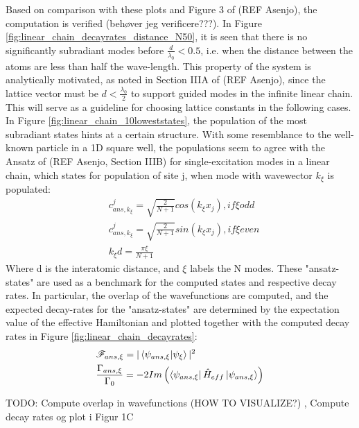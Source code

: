 \documentclass{article}
\begin{document}
Based on comparison with these plots and Figure 3 of (REF Asenjo), the computation is verified (behøver jeg verificere???). In Figure \ref{fig:linear_chain_decayrates_distance_N50}, it is seen that there is no significantly subradiant modes before $\frac{d}{\lambda_0} < 0.5$, i.e. when the distance between the atoms are less than half the wave-length. This property of the system is analytically motivated, as noted in Section IIIA of (REF Asenjo), since the lattice vector must be $d < \frac{\lambda_0}{2}$ to support guided modes in the infinite linear chain. This will serve as a guideline for choosing lattice constants in the following cases. In Figure \ref{fig:linear_chain_10loweststates}, the population of the most subradiant states hints at a certain structure. With some resemblance to the well-known particle in a 1D square well, the populations seem to agree with the Ansatz of (REF Asenjo, Section IIIB) for single-excitation modes in a linear chain, which states for population of site j, when mode with wavewector $k_\xi$ is populated: 
\begin{equation}\label{eq:ansatz}
    \begin{split}
        & c^j_{ans,k_\xi} = \sqrt{\frac{2}{N + 1}} cos(k_\xi x_j), if \xi odd \\
        & c^j_{ans,k_\xi} = \sqrt{\frac{2}{N + 1}} sin(k_\xi x_j), if \xi even \\
        & k_\xi d = \frac{\pi \xi}{N + 1}
    \end{split}
\end{equation}
Where d is the interatomic distance, and $\xi$ labels the N modes. These "ansatz-states" are used as a benchmark for the computed states and respective decay rates. In particular, the overlap of the wavefunctions are computed, and the expected decay-rates for the "ansatz-states" are determined by the expectation value of the effective Hamiltonian and plotted together with the computed decay rates in Figure \ref{fig:linear_chain_decayrates}:
\begin{equation}\label{eq:overlap}
    \begin{split}
        &\mathscr{F}_{ans,\xi} = |\bra{\psi_{ans,\xi}}\ket{\psi_\xi}|^2 \\
        &\frac{\Gamma_{ans,\xi}}{\Gamma_0} = -2 Im \left( \bra{\psi_{ans,\xi}} \hat{H}_{eff} \ket{\psi_{ans,\xi}} \right)
    \end{split}
\end{equation}

TODO: Compute overlap in wavefunctions (HOW TO VISUALIZE?) , Compute decay rates og plot i Figur 1C
\end{document}
